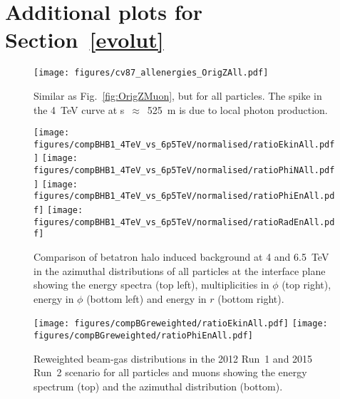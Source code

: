 \section{Additional plots for Section~\ref{evolut} \label{evolutApp}}
\begin{figure}[!htb]
\begin{center}
  \texttt{[image: figures/cv87\_allenergies\_OrigZAll.pdf]}
\end{center}
\vspace{-0.6cm}
 \caption{Similar as Fig.~\ref{fig:OrigZMuon}, but for all particles. The spike in the 4~TeV curve at s~$\approx$~525~m is due to local photon production.
  \label{fig:OrigZAll}} 
\end{figure}





\begin{figure}
\centering
  \texttt{[image: figures/compBHB1\_4TeV\_vs\_6p5TeV/normalised/ratioEkinAll.pdf]}
  \texttt{[image: figures/compBHB1\_4TeV\_vs\_6p5TeV/normalised/ratioPhiNAll.pdf]}
  \texttt{[image: figures/compBHB1\_4TeV\_vs\_6p5TeV/normalised/ratioPhiEnAll.pdf]}
  \texttt{[image: figures/compBHB1\_4TeV\_vs\_6p5TeV/normalised/ratioRadEnAll.pdf]}
\vspace{-0.6cm}
 \caption{Comparison of betatron halo induced background at 4 and 6.5~TeV in the azimuthal distributions of all particles at the interface plane showing the energy spectra (top left), multiplicities in $\phi$ (top right), energy in $\phi$ (bottom left) and energy in $r$ (bottom right).
  \label{compBHB1run1run22}}
\end{figure}









\begin{figure}%
\centering
\texttt{[image: figures/compBGreweighted/ratioEkinAll.pdf]}
\texttt{[image: figures/compBGreweighted/ratioPhiEnAll.pdf]}
\caption{Reweighted beam-gas distributions in the 2012 Run~1 and 2015 Run~2 scenario for all particles and muons showing the energy spectrum (top) and the azimuthal distribution (bottom).
  \label{fig:compBGreweighted12}}
\end{figure}





